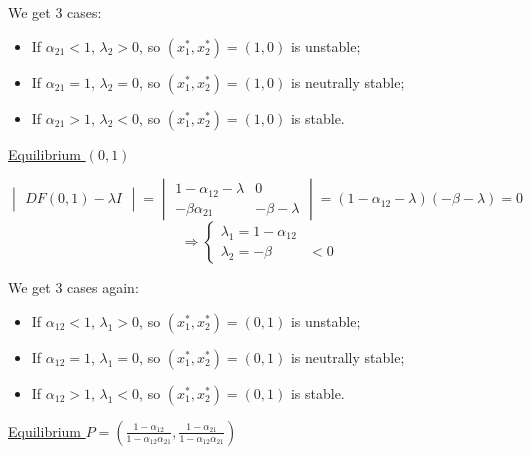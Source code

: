 \documentclass[11pt,a4paper]{scrartcl}
\theoremstyle{definition}
\begin{document}
We get 3 cases:
\begin{itemize}
\item If $\alpha_{21}<1$, $\lambda_2>0$, so $(x_1^{*}, x_2^{*})=(1, 0)$ is unstable;
\item If $\alpha_{21}=1$, $\lambda_2=0$, so $(x_1^{*}, x_2^{*})=(1, 0)$ is neutrally stable;
\item If $\alpha_{21}>1$, $\lambda_2<0$, so $(x_1^{*}, x_2^{*})=(1, 0)$ is stable.
\end{itemize}

\vspace{1em}
\underline{Equilibrium $(0, 1)$}

\begin{center}
$\begin{vmatrix}
	DF(0,1)-\lambda I
\end{vmatrix}=\begin{vmatrix}
	1-\alpha_{12}-\lambda & 0 \\
	-\beta \alpha_{21} & -\beta - \lambda
\end{vmatrix}=(1-\alpha_{12}-\lambda)(-\beta-\lambda)=0$ \[ \Rightarrow \left\{ \begin{array}{ll}
         \lambda_1=1-\alpha_{12}\\
        \lambda_2=-\beta & \mbox{$<0$} \end{array} \right. \] 
\end{center}

We get 3 cases again:
\begin{itemize}
\item If $\alpha_{12}<1$, $\lambda_1>0$, so $(x_1^{*}, x_2^{*})=(0, 1)$ is unstable;
\item If $\alpha_{12}=1$, $\lambda_1=0$, so $(x_1^{*}, x_2^{*})=(0, 1)$ is neutrally stable;
\item If $\alpha_{12}>1$, $\lambda_1<0$, so $(x_1^{*}, x_2^{*})=(0, 1)$ is stable.
\end{itemize}
\vspace{1em}
\newpage
\underline{Equilibrium $P=(\frac{1-\alpha_{12}}{1-\alpha_{12}\alpha_{21}}, \frac{1-\alpha_{21}}{1-\alpha_{12}\alpha_{21}})$}
\end{document}

